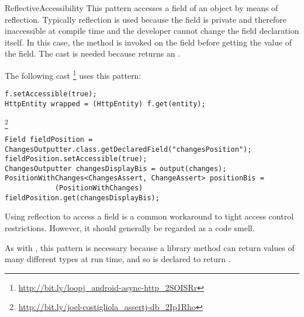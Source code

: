 \begin{pattern}{ReflectiveAccessibility}
This pattern accesses a field of an object by means of reflection.
Typically reflection is used because the field is private and therefore
inaccessible at compile time and the developer cannot change the field
declaration itself.
In this case, the method  is invoked on the field
before getting the value of the field.
The cast is needed because  returns an .

\instances{}
The following cast%
\footnote{\url{http://bit.ly/loopj_android-async-http_2SOISRr}}
uses this pattern:

\begin{verbatim}
f.setAccessible(true);
HttpEntity wrapped = (HttpEntity) f.get(entity);
\end{verbatim}


\footnote{\url{http://bit.ly/joel-costigliola_assertj-db_2Ip1Rho}}

\begin{verbatim}
Field fieldPosition = ChangesOutputter.class.getDeclaredField("changesPosition");
fieldPosition.setAccessible(true);
ChangesOutputter changesDisplayBis = output(changes);
PositionWithChanges<ChangesAssert, ChangeAssert> positionBis = 
            (PositionWithChanges) fieldPosition.get(changesDisplayBis);
\end{verbatim}


\discussion{}
Using reflection to access a field is a common workaround to tight access
  control restrictions. However, it should generally be regarded as a code
  smell.

As with , this pattern is necessary because
a library method can return values of many different types at run time,
and so is declared to return .


\end{pattern}

